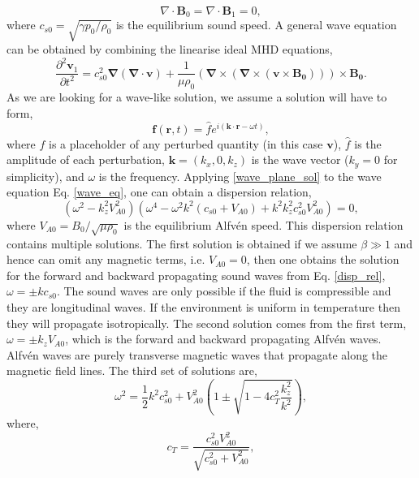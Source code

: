 \documentclass[12pt]{ociamthesis}
\newcommand{\bs}[1]{\boldsymbol{#1}}
\newcommand{\bn}{\boldsymbol{\nabla}}
\newcommand{\eref}[1]{Eq. \eqref{#1}}
\newcommand{\Alfven}{Alfv\'{e}n }
\begin{document}
\begin{equation}\label{mhd_lin2}
\nabla \cdot \boldsymbol{B}_0 = \nabla \cdot \boldsymbol{B}_1 = 0 ,
\end{equation}
where $c_{s0} = \sqrt{\gamma p_0/ \rho_0}$ is the equilibrium sound speed. A general wave equation can be obtained by combining the linearise ideal MHD equations,
\begin{equation}\label{wave_eq}
    \frac{\partial^2 \bs{v}_1}{\partial t^2} = c_{s0}^2 \bn (\bn \cdot \bs{v}) + \frac{1}{\mu \rho_0} (\bn \times (\bn \times (\bs{v}\times\bs{B_0}))) \times \bs{B_0}.
\end{equation}
As we are looking for a wave-like solution, we assume a solution will have to form,
\begin{equation}\label{wave_plane_sol}
    \bs{f}(\bs{r},t) = \hat{f} e^{i( \bs{k}\cdot \bs{r} - \omega t)},
\end{equation}
where $f$ is a placeholder of any perturbed quantity (in this case $\bs{v}$), $\hat{f}$ is the amplitude of each perturbation, $\bs{k}=(k_x,0,k_z)$ is the wave vector ($k_y=0$ for simplicity), and $\omega$ is the frequency. Applying \eqref{wave_plane_sol} to the wave equation \eref{wave_eq}, one can obtain a dispersion relation,
\begin{equation}\label{disp_rel}
 (\omega^2-k^2_z V_{A0}^2)(\omega^4-\omega^2k^2(c_{s0}+V_{A0})+k^2 k^2_z c_{s0}^2 V_{A0}^2) = 0,
\end{equation}
where $V_{A0}=B_0/\sqrt{\mu \rho_0}$ is the equilibrium \Alfven speed. This dispersion relation contains multiple solutions. The first solution is obtained if we assume $\beta \gg 1$ and hence can omit any magnetic terms, i.e. $V_{A0}=0$, then one obtains the solution for the forward and backward propagating sound waves from \eref{disp_rel}, $\omega = \pm k c_{s0}$. The sound waves are only possible if the fluid is compressible and they are longitudinal waves. If the environment is uniform in temperature then they will propagate isotropically. The second solution comes from the first term, $\omega=\pm k_z V_{A0}$, which is the forward and backward propagating \Alfven waves. \Alfven waves are purely transverse magnetic waves that propagate along the magnetic field lines. The third set of solutions are,
\begin{equation}\label{MA_waves}
    \omega^2 = \frac{1}{2} k^2{c_{s0}^2+V_{A0}^2} \left( 1 \pm \sqrt{1-4c^2_T \frac{ k^2_z}{k^2}}  \right),
\end{equation}
where, 
\begin{equation}
  c_T = \frac{c_{s0}^2V_{A0}^2}{\sqrt{c_{s0}^2+V_{A0}^2}}, 
\end{equation}
\end{document}
